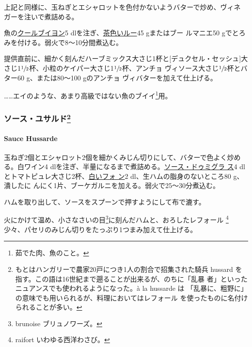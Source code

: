 上記と同様に、玉ねぎとエシャロットを色付かないようバターで炒め、ヴィネ
ガーを注いで煮詰める。

魚の\href{}{クールブイヨン}5
dlを注ぎ、\protect\hyperlink{roux-brun}{茶色いルー}45 gまたはブー
ルマニエ50 gでとろみを付ける。弱火で8〜10分間煮込む。

提供直前に、細かく刻んだハーブミックス大さじ1杯と{[}デュクセル・セッシュ{]}大
さじ1\(\sfrac{1}{2}\)杯、小粒のケイパー大さじ1\(\sfrac{1}{2}\)杯、アンチョ
ヴィソース大さじ\(\sfrac{1}{2}\)杯とバター60 g、または80〜100
gのアンチョ ヴィバターを加えて仕上げる。

\ldots{}\ldots{}エイのような、あまり高級ではない魚のブイイ\footnote{茹でた肉、魚のこと。}用。

\maeaki

\hypertarget{ux30bdux30fcux30b9ux30e6ux30b5ux30ebux30c951}{%
\subsubsection[ソース・ユサルド]{\texorpdfstring{ソース・ユサルド\footnote{もとはハンガリーで農家20戸につき1人の割合で招集された騎兵
  hussard を指す。この語は16世紀まで遡ることが出来るが、のちに「乱暴
  者」といったニュアンスでも使われるようになった。à la hussarde は
  「乱暴に、粗野に」の意味でも用いられるが、料理においてはレフォール
  を使ったものに名付けられることが多い。}}{ソース・ユサルド}}\label{ux30bdux30fcux30b9ux30e6ux30b5ux30ebux30c951}}

\hypertarget{sauce-hussarde}{%
\paragraph{Sauce Hussarde}\label{sauce-hussarde}}


玉ねぎ2個とエシャロット2個を細かくみじん切りにして、バターで色よく炒め
る。白ワイン4
dlを注ぎ、半量になるまで煮詰める。\protect\hyperlink{sauce-demi-glace}{ソース・ドゥミグラ
ス}4
dlとトマトピュレ大さじ2杯、\protect\hyperlink{fonds-blanc-ordinaire}{白いフォ
ン}2 dl、生ハムの脂身のないところ80 g、潰したに
んにく1片、ブーケガルニを加える。弱火で25〜30分煮込む。

ハムを取り出して、ソースをスプーンで押すようにして布で漉す。

火にかけて温め、小さなさいの目\footnote{brunoise ブリュノワーズ。}に刻んだハムと、おろしたレフォール
\footnote{raifort いわゆる西洋わさび。}少々、パセリのみじん切りをたっぷり1つまみ加えて仕上げる。

